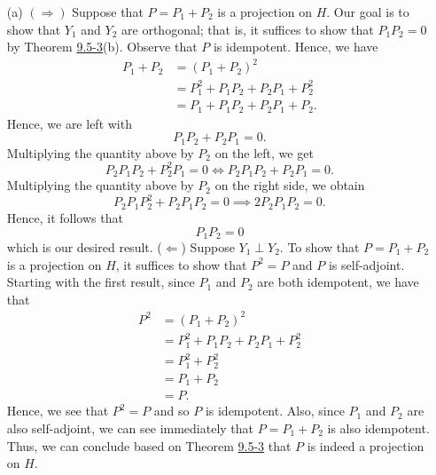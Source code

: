 \begin{enumerate}
    \item[(a)] \( (\Longrightarrow) \) Suppose that \( P =  {P}_{1} + {P}_{2}  \) is a projection on \( H  \). Our goal is to show that \( {Y}_{1} \) and \( {Y}_{2}  \) are orthogonal; that is, it suffices to show that \( {P}_{1} {P}_{2} = 0  \) by Theorem {\hyperref[9.5-3]{9.5-3}}(b). Observe that \( P  \) is idempotent. Hence, we have  
        \begin{align*}
            {P}_{1} + {P}_{2} &= ({P}_{1} + {P}_{2})^{2} \\
                              &= {P}_{1}^{2} + {P}_{1} {P}_{2} + {P}_{2} {P}_{1} + {P}_{2}^{2} \\
                              &= {P}_{1} + {P}_{1} {P}_{2} + {P}_{2} {P}_{1}  +{P}_{2}.
        \end{align*}
        Hence, we are left with 
        \[  {P}_{1}{P}_{2} + {P}_{2} {P}_{1} = 0.  \]
        Multiplying the quantity above by \( {P}_{2}  \) on the left, we get 
        \[  {P}_{2} {P}_{1} {P}_{2} + {P}_{2}^{2} {P}_{1} = 0 \iff {P}_{2} {P}_{1} {P}_{2} + {P}_{2} {P}_{1} = 0. \]
        Multiplying the quantity above by \( {P}_{2} \) on the right side, we obtain
        \[  {P}_{2} {P}_{1} {P}_{2}^{2} + {P}_{2} {P}_{1} {P}_{2} = 0 \implies 2{P}_{2} {P}_{1} {P}_{2} = 0.    \]
        Hence, it follows that 
        \[  {P}_{1}{P}_{2} = 0  \]
        which is our desired result.
        (\( \Longleftarrow \)) Suppose \( {Y}_{1} \perp {Y}_{2} \). To show that \( P = {P}_{1} + {P}_{2} \) is a projection on \( H  \), it suffices to show that \( P^{2} = P  \) and \( P  \) is self-adjoint. Starting with the first result, since \( {P}_{1} \) and \( {P}_{2} \) are both idempotent, we have that 
        \begin{align*}
            P^{2} &= ({P}_{1} + {P}_{2})^{2} \\
                  &= {P}_{1}^{2} + {P}_{1} {P}_{2}  +{P}_{2} {P}_{1} + {P}_{2}^{2} \\
                  &= {P}_{1}^{2} + {P}_{2}^{2} \\
                  &= {P}_{1} + {P}_{2} \\
                  &= P.
        \end{align*}
        Hence, we see that \( P^{2} = P  \) and so \( P  \) is idempotent. Also, since \( {P}_{1} \) and \( {P}_{2}  \) are also self-adjoint, we can see immediately that \( P  = {P}_{1} + {P}_{2} \) is also idempotent. Thus, we can conclude based on Theorem {\hyperref[9.5-3]{9.5-3}} that \( P  \) is indeed a projection on \( H  \).

\end{enumerate}
